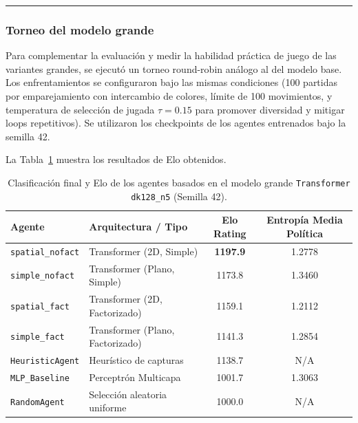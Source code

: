 \documentclass[12pt, a4paper]{article}
\begin{document}
\rule{\textwidth}{0.2pt}
\subsubsection{Torneo del modelo grande}

Para complementar la evaluación y medir la habilidad práctica de juego de las variantes grandes, se ejecutó un torneo round-robin análogo al del modelo base. Los enfrentamientos se configuraron bajo las mismas condiciones (100 partidas por emparejamiento con intercambio de colores, límite de 100 movimientos, y temperatura de selección de jugada $\tau = 0.15$ para promover diversidad y mitigar loops repetitivos). Se utilizaron los checkpoints de los agentes entrenados bajo la semilla 42.

La Tabla~\ref{tab:eloration_ablation_tournament_dk128} muestra los resultados de Elo obtenidos.

\begin{table}[htbp]
    \centering
    \small
    \begin{tabular}{|l|l|c|c|}
    \hline
    \textbf{Agente} & \textbf{Arquitectura / Tipo} & \textbf{Elo Rating} & \textbf{Entropía Media Política} \\
    \hline
    \texttt{spatial\_nofact} & Transformer (2D, Simple) & \textbf{1197.9} & 1.2778 \\
    \texttt{simple\_nofact} & Transformer (Plano, Simple) & 1173.8 & 1.3460 \\
    \texttt{spatial\_fact} & Transformer (2D, Factorizado) & 1159.1 & 1.2112 \\
    \texttt{simple\_fact} & Transformer (Plano, Factorizado) & 1141.3 & 1.2854 \\
    \texttt{HeuristicAgent} & Heurístico de capturas & 1138.7 & N/A \\
    \texttt{MLP\_Baseline} & Perceptrón Multicapa & 1001.7 & 1.3063 \\
    \texttt{RandomAgent} & Selección aleatoria uniforme & 1000.0 & N/A \\
    \hline
    \end{tabular}
    \caption[Elo y clasificación para el modelo grande]{Clasificación final y Elo de los agentes basados en el modelo grande \texttt{Transformer dk128\_n5} (Semilla 42).}
    \label{tab:eloration_ablation_tournament_dk128}
\end{table}
\end{document}
